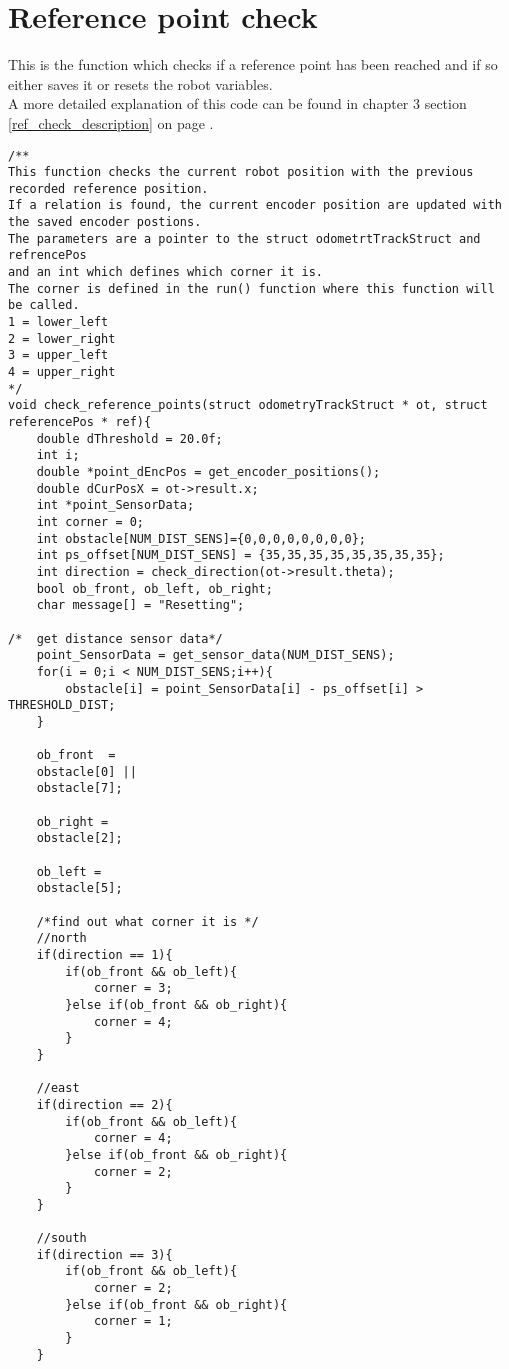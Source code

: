 \section{Reference point check}
\label{ref_check_code}
This is the function which checks if a reference point has been reached and if so either saves it or resets the robot variables.\\
A more detailed explanation of this code can be found in chapter 3 section \ref{ref_check_description} on page \pageref{ref_check_description}.
\begin{lstlisting}[caption={Function which checks if a reference point has been reached}]
/**
This function checks the current robot position with the previous recorded reference position.
If a relation is found, the current encoder position are updated with the saved encoder postions.
The parameters are a pointer to the struct odometrtTrackStruct and refrencePos 
and an int which defines which corner it is. 
The corner is defined in the run() function where this function will be called.
1 = lower_left
2 = lower_right
3 = upper_left
4 = upper_right
*/
void check_reference_points(struct odometryTrackStruct * ot, struct referencePos * ref){
	double dThreshold = 20.0f;
	int i;
	double *point_dEncPos = get_encoder_positions(); 
	double dCurPosX = ot->result.x;
	int *point_SensorData;
	int corner = 0;
	int obstacle[NUM_DIST_SENS]={0,0,0,0,0,0,0,0};
	int ps_offset[NUM_DIST_SENS] = {35,35,35,35,35,35,35,35};
	int direction = check_direction(ot->result.theta);
	bool ob_front, ob_left, ob_right;
	char message[] = "Resetting";

/*	get distance sensor data*/
	point_SensorData = get_sensor_data(NUM_DIST_SENS);
	for(i = 0;i < NUM_DIST_SENS;i++){
		obstacle[i] = point_SensorData[i] - ps_offset[i] > THRESHOLD_DIST;
	}	

	ob_front  = 
	obstacle[0] ||
	obstacle[7];

	ob_right = 
	obstacle[2];

	ob_left = 
	obstacle[5];

	/*find out what corner it is */
	//north 
	if(direction == 1){
		if(ob_front && ob_left){
			corner = 3;
		}else if(ob_front && ob_right){
			corner = 4;
		}
	}

	//east
	if(direction == 2){
		if(ob_front && ob_left){
			corner = 4;
		}else if(ob_front && ob_right){
			corner = 2;
		}
	}

	//south
	if(direction == 3){
		if(ob_front && ob_left){
			corner = 2;
		}else if(ob_front && ob_right){
			corner = 1;
		}
	}


\end{lstlisting}
